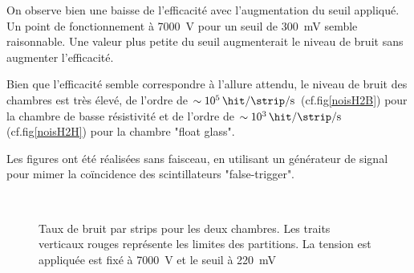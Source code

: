 On observe bien une baisse de l'efficacité avec l'augmentation du seuil appliqué. Un point de fonctionnement à \SI{7000}{\volt} pour un seuil de \SI{300}{\milli\volt} semble raisonnable. Une valeur plus petite du seuil augmenterait le niveau de bruit sans augmenter l'efficacité.

Bien que l'efficacité semble correspondre à l'allure attendu, le niveau de bruit des chambres est très élevé, de l'ordre de $\sim\SI{e5}{\hit\per\strip\per\second}$ (cf.fig\ref{noisH2B}) pour la chambre de basse résistivité et de l'ordre de $\sim\SI{e3}{\hit\per\strip\per\second}$ (cf.fig\ref{noisH2H}) pour la chambre "float glass". 

Les figures ont été réalisées sans faisceau, en utilisant un générateur de signal pour mimer la coïncidence des scintillateurs "false-trigger".

\begin{figure}[ht!]
	\centering
	\vspace*{2.5cm}
	\\
	\vspace*{2.5cm}
	\caption{Taux de bruit par strips pour les deux chambres. Les traits verticaux rouges représente les limites des partitions. La tension est appliquée est fixé à \SI{7000}{\volt} et le seuil à \SI{220}{\milli\volt}}
\end{figure}



